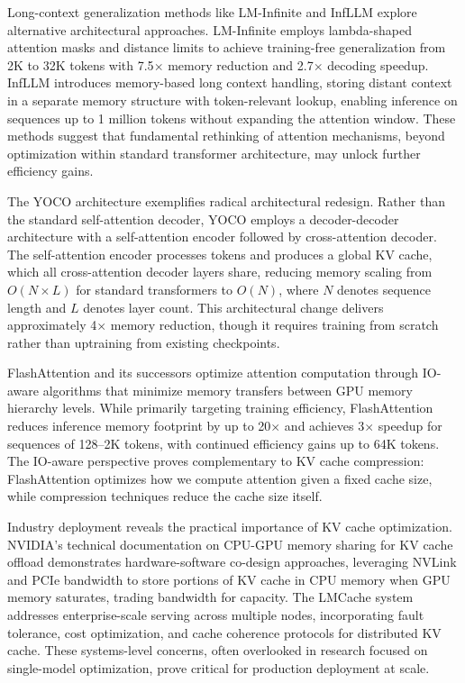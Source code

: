 Long-context generalization methods like LM-Infinite \citep{han2024lminfinite} and InfLLM \citep{zhang2024infllm} explore alternative architectural approaches. LM-Infinite employs lambda-shaped attention masks and distance limits to achieve training-free generalization from 2K to 32K tokens with 7.5$\times$ memory reduction and 2.7$\times$ decoding speedup. InfLLM introduces memory-based long context handling, storing distant context in a separate memory structure with token-relevant lookup, enabling inference on sequences up to 1 million tokens without expanding the attention window. These methods suggest that fundamental rethinking of attention mechanisms, beyond optimization within standard transformer architecture, may unlock further efficiency gains.

The YOCO architecture \citep{sun2024yoco} exemplifies radical architectural redesign. Rather than the standard self-attention decoder, YOCO employs a decoder-decoder architecture with a self-attention encoder followed by cross-attention decoder. The self-attention encoder processes tokens and produces a global KV cache, which all cross-attention decoder layers share, reducing memory scaling from $O(N \times L)$ for standard transformers to $O(N)$, where $N$ denotes sequence length and $L$ denotes layer count. This architectural change delivers approximately 4$\times$ memory reduction, though it requires training from scratch rather than uptraining from existing checkpoints.

FlashAttention \citep{dao2022flashattention} and its successors optimize attention computation through IO-aware algorithms that minimize memory transfers between GPU memory hierarchy levels. While primarily targeting training efficiency, FlashAttention reduces inference memory footprint by up to 20$\times$ and achieves 3$\times$ speedup for sequences of 128--2K tokens, with continued efficiency gains up to 64K tokens. The IO-aware perspective proves complementary to KV cache compression: FlashAttention optimizes how we compute attention given a fixed cache size, while compression techniques reduce the cache size itself.

Industry deployment reveals the practical importance of KV cache optimization. NVIDIA's technical documentation on CPU-GPU memory sharing for KV cache offload demonstrates hardware-software co-design approaches, leveraging NVLink and PCIe bandwidth to store portions of KV cache in CPU memory when GPU memory saturates, trading bandwidth for capacity. The LMCache system \citep{liu2024lmcache} addresses enterprise-scale serving across multiple nodes, incorporating fault tolerance, cost optimization, and cache coherence protocols for distributed KV cache. These systems-level concerns, often overlooked in research focused on single-model optimization, prove critical for production deployment at scale.

